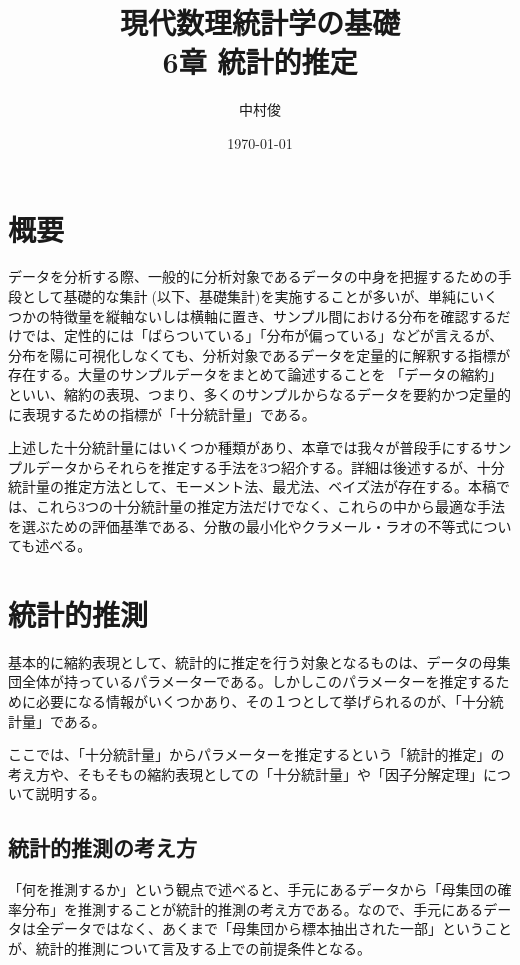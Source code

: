 \documentclass[a4paper,uplatex]{jsarticle}
\begin{document}
\title{現代数理統計学の基礎 \\ 6章 統計的推定}
\author{中村俊}
\date{\today}
\maketitle
\setcounter{section}{-1}

\section{概要}
データを分析する際、一般的に分析対象であるデータの中身を把握するための手段として基礎的な集計(以下、基礎集計)を実施することが多いが、単純にいくつかの特徴量を縦軸ないしは横軸に置き、サンプル間における分布を確認するだけでは、定性的には「ばらついている」「分布が偏っている」などが言えるが、分布を陽に可視化しなくても、分析対象であるデータを定量的に解釈する指標が存在する。大量のサンプルデータをまとめて論述することを
「データの縮約」といい、縮約の表現、つまり、多くのサンプルからなるデータを要約かつ定量的に表現するための指標が「十分統計量」である。

上述した十分統計量にはいくつか種類があり、本章では我々が普段手にするサンプルデータからそれらを推定する手法を3つ紹介する。詳細は後述するが、十分統計量の推定方法として、モーメント法、最尤法、ベイズ法が存在する。本稿では、これら3つの十分統計量の推定方法だけでなく、これらの中から最適な手法を選ぶための評価基準である、分散の最小化やクラメール・ラオの不等式についても述べる。



\section{統計的推測}
基本的に縮約表現として、統計的に推定を行う対象となるものは、データの母集団全体が持っているパラメーターである。しかしこのパラメーターを推定するために必要になる情報がいくつかあり、その１つとして挙げられるのが、「十分統計量」である。

ここでは、「十分統計量」からパラメーターを推定するという「統計的推定」の考え方や、そもそもの縮約表現としての「十分統計量」や「因子分解定理」について説明する。

\subsection{統計的推測の考え方}
「何を推測するか」という観点で述べると、手元にあるデータから「母集団の確率分布」を推測することが統計的推測の考え方である。なので、手元にあるデータは全データではなく、あくまで「母集団から標本抽出された一部」ということが、統計的推測について言及する上での前提条件となる。
\end{document}
